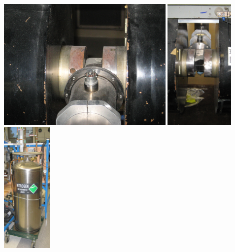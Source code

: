 \documentclass{../lab}
\begin{document}
\noindent
\href{http://experimentationlab.berkeley.edu/sites/default/files/images/Chamber_Front_3304.jpg}{\includegraphics[width=0.33\linewidth,height=6.5cm,keepaspectratio]{images/Chamber_Front_3304.jpg}}
\href{http://experimentationlab.berkeley.edu/sites/default/files/images/Magnet_Backside_Polepieces_Crop_3307.jpg}{\includegraphics[width=0.33\linewidth,height=6.5cm,keepaspectratio]{images/Magnet_Backside_Polepieces_Crop_3307.jpg}}
\href{http://experimentationlab.berkeley.edu/sites/default/files/images/SHE_LN-2_Crop_3542.jpg}{\includegraphics[width=0.33\linewidth,height=6.5cm,keepaspectratio]{images/SHE_LN-2_Crop_3542.jpg}}
\end{document}
